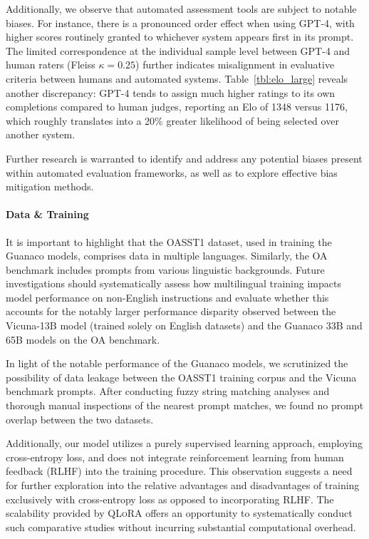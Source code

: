 Additionally, we observe that automated assessment tools are subject to notable biases. For instance, there is a pronounced order effect when using GPT-4, with higher scores routinely granted to whichever system appears first in its prompt. The limited correspondence at the individual sample level between GPT-4 and human raters (Fleiss $\kappa=0.25$) further indicates misalignment in evaluative criteria between humans and automated systems. Table~\ref{tbl:elo_large} reveals another discrepancy: GPT-4 tends to assign much higher ratings to its own completions compared to human judges, reporting an Elo of 1348 versus 1176, which roughly translates into a 20\% greater likelihood of being selected over another system.

Further research is warranted to identify and address any potential biases present within automated evaluation frameworks, as well as to explore effective bias mitigation methods.

\paragraph{Data \& Training} It is important to highlight that the OASST1 dataset, used in training the {Guanaco} models, comprises data in multiple languages. Similarly, the OA benchmark includes prompts from various linguistic backgrounds. Future investigations should systematically assess how multilingual training impacts model performance on non-English instructions and evaluate whether this accounts for the notably larger performance disparity observed between the Vicuna-13B model (trained solely on English datasets) and the {Guanaco} 33B and 65B models on the OA benchmark.

In light of the notable performance of the {Guanaco} models, we scrutinized the possibility of data leakage between the OASST1 training corpus and the Vicuna benchmark prompts. After conducting fuzzy string matching analyses and thorough manual inspections of the nearest prompt matches, we found no prompt overlap between the two datasets.

Additionally, our model utilizes a purely supervised learning approach, employing cross-entropy loss, and does not integrate reinforcement learning from human feedback (RLHF) into the training procedure. This observation suggests a need for further exploration into the relative advantages and disadvantages of training exclusively with cross-entropy loss as opposed to incorporating RLHF. The scalability provided by \textsc{QLoRA} offers an opportunity to systematically conduct such comparative studies without incurring substantial computational overhead.

